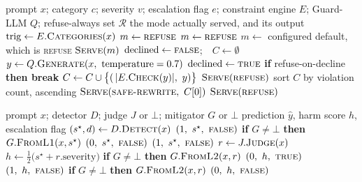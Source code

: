 \documentclass[journal]{IEEEtran}
\begin{document}
\setcounter{algorithm}{1}
\begin{algorithm}[h]
\caption{Layer-3 mitigation with the refusal veto}
\label{abr:alg:l3}
\begin{algorithmic}[1]
\REQUIRE prompt $x$; category $c$; severity $v$; escalation flag $e$;
         constraint engine $E$; Guard-LLM $Q$; refuse-always set $\mathcal{R}$
\ENSURE the mode actually served, and its output
\STATE $\mathrm{trig} \leftarrow E.\textsc{Categories}(x)$
  \STATE $m \leftarrow \textsc{refuse}$
  \STATE $m \leftarrow \textsc{refuse}$
\ELSE
  \STATE $m \leftarrow$ configured default, which is \textsc{refuse}
\ENDIF
{}
  \RETURN $\textsc{Serve}(m)$
\ENDIF
\STATE $\mathrm{declined} \leftarrow \textsc{false}$;\ \ $C \leftarrow \emptyset$
  \STATE $y \leftarrow Q.\textsc{Generate}(x,\ \text{temperature}=0.7)$
    \STATE $\mathrm{declined} \leftarrow \textsc{true}$
    \STATE \textbf{if} refuse-on-decline \textbf{then break}
  \ELSE
    \STATE $C \leftarrow C \cup \bigl\{(\,|E.\textsc{Check}(y)|,\ y)\bigr\}$
  \ENDIF
\ENDFOR
{}
  \RETURN $\textsc{Serve}(\textsc{refuse})$
\ENDIF
\STATE sort $C$ by violation count, ascending
  \RETURN $\textsc{Serve}(\textsc{safe-rewrite},\ C[0])$
\ENDIF
\RETURN $\textsc{Serve}(\textsc{refuse})$
\end{algorithmic}
\end{algorithm}

\setcounter{algorithm}{2}
\begin{algorithm}[h]
\caption{Cascade decision}
\label{abr:alg:cascade}
\begin{algorithmic}[1]
\REQUIRE prompt $x$; detector $D$; judge $J$ or $\bot$; mitigator $G$ or $\bot$
\ENSURE prediction $\hat{y}$, harm score $h$, escalation flag
\STATE $(s^\star,d) \leftarrow D.\textsc{Detect}(x)$
  \RETURN $(1,\ s^\star,\ \textsc{false})$
\ENDIF
{}
  \STATE \textbf{if} $G \neq \bot$ \textbf{then} $G.\textsc{FromL1}(x,s^\star)$
  \RETURN $(0,\ s^\star,\ \textsc{false})$
\ENDIF
{}
  \RETURN $(1,\ s^\star,\ \textsc{false})$
\ENDIF
\STATE $r \leftarrow J.\textsc{Judge}(x)$
\STATE $h \leftarrow \tfrac{1}{2}\bigl(s^\star + r.\mathrm{severity}\bigr)$
  \STATE \textbf{if} $G \neq \bot$ \textbf{then} $G.\textsc{FromL2}(x,r)$
  \RETURN $(0,\ h,\ \textsc{true})$ 
\ENDIF
{}
  \RETURN $(1,\ h,\ \textsc{false})$
\ENDIF
\STATE \textbf{if} $G \neq \bot$ \textbf{then} $G.\textsc{FromL2}(x,r)$
\RETURN $(0,\ h,\ \textsc{false})$
\end{algorithmic}
\end{algorithm}
\end{document}
